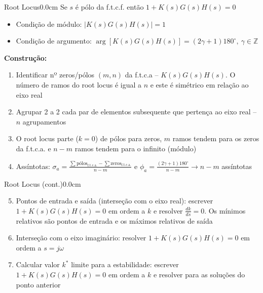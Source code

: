 \documentclass[portuguese,10pt,3col]{cheatsheet}
\begin{document}
\begin{multicols}{3}
\begin{cheatsheetbox}{Root Locus}{0.0cm}
    Se $s$ é pólo da f.t.c.f. então $1 + K(s)G(s)H(s) = 0$
    \begin{itemize}
        \item Condição de módulo: $|K(s)G(s)H(s)| = 1$
        \item Condição de argumento: $\arg\left[K(s)G(s)H(s)\right] = (2 \gamma + 1)180^\circ, \ \gamma \in \mathbb{Z}$
    \end{itemize}
    
    \textbf{Construção:}
    \begin{enumerate}
        \item Identificar nº zeros/pólos $(m, n)$ da f.t.c.a -- $K(s)G(s)H(s)$. O número de ramos do root locus é igual a $n$ e este é simétrico em relação ao eixo real
        \item Agrupar 2 a 2 cada par de elementos subsequente que pertença ao eixo real -- $n$ agrupamentos
        \item O root locus parte ($k = 0$) de pólos para zeros, $m$ ramos tendem para os zeros da f.t.c.a. e $n - m$ ramos tendem para o infinito (módulo)
        \item Assíntotas: $\sigma_a = \frac{\sum \text{pólos}_\text{f.t.c.a.} - \sum \text{zeros}_\text{f.t.c.a.}}{n - m}$ e $\phi_a = \frac{(2\gamma + 1)180^\circ}{n - m} \rightarrow n - m$ assíntotas
    \end{enumerate}
\end{cheatsheetbox}

\begin{cheatsheetbox}{Root Locus (cont.)}{0.0cm}
    \begin{enumerate}
        \setcounter{enumi}{4}
        \item Pontos de entrada e saída (interseção com o eixo real): escrever $1 + K(s)G(s)H(s) = 0$ em ordem a $k$ e resolver $\frac{dk}{ds} = 0$. Os mínimos relativos são pontos de entrada e os máximos relativos de saída
        \item Interseção com o eixo imaginário: resolver $1 + K(s)G(s)H(s) = 0$ em ordem a $s = j\omega$
        \item Calcular valor $k^*$ limite para a estabilidade: escrever $1 + K(s)G(s)H(s) = 0$ em ordem a $k$ e resolver para as soluções do ponto anterior
    \end{enumerate}
\end{cheatsheetbox}


\end{multicols}
\end{document}
